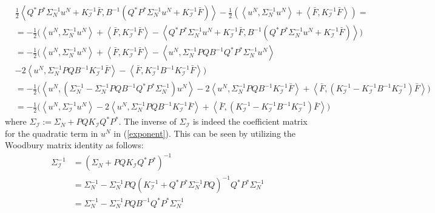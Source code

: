 \begin{align}
    &\frac{1}{2}\left\langle Q^{*}P^{*}\Sigma_{N}^{-1}u^{N} + K_{\mathcal{I}}^{-1}\bar{F}, B^{-1}\left(Q^{*}P^{*}\Sigma_{N}^{-1}u^{N} + K_{\mathcal{I}}^{-1}\bar{F}\right) \right\rangle -\frac{1}{2}\left(\left\langle u^{N}, \Sigma_{N}^{-1}u^{N}\right\rangle + \left\langle \bar{F},K_{\mathcal{I}}^{-1}\bar{F} \right\rangle \right) =  \nonumber \\
    &=-\frac{1}{2}\Big( \left\langle u^{N}, \Sigma_{N}^{-1}u^{N}\right\rangle + \left\langle \bar{F}, K_{\mathcal{I}}^{-1}\bar{F} \right\rangle - \left\langle Q^{*}P^{*}\Sigma_{N}^{-1}u^{N} + K_{\mathcal{I}}^{-1}\bar{F}, B^{-1}\left(Q^{*}P^{*}\Sigma_{N}^{-1}u^{N} + K_{\mathcal{I}}^{-1}\bar{F}\right) \right\rangle \Big) \nonumber \\
    &=-\frac{1}{2}\Big(\left\langle u^{N}, \Sigma_{N}^{-1}u^{N}\right\rangle + \left\langle \bar{F}, K_{\mathcal{I}}^{-1}\bar{F} \right\rangle - \left\langle u^{N},\Sigma_{N}^{-1}PQB^{-1}Q^{*}P^{*}\Sigma_{N}^{-1}u^{N} \right\rangle \nonumber \\
    &- 2\left\langle u^{N},\Sigma_{N}^{-1}PQB^{-1}K_{\mathcal{I}}^{-1}\bar{F} \right\rangle - \left\langle \bar{F}, K_{\mathcal{I}}^{-1}B^{-1}K_{\mathcal{I}}^{-1}\bar{F} \right\rangle \Big) \nonumber \\
    &= -\frac{1}{2}\Big( \left\langle u^{N}, (\Sigma_{N}^{-1} - \Sigma_{N}^{-1}PQB^{-1}Q^{*}P^{*}\Sigma_{N}^{-1})u^{N} \right\rangle - 2 \left\langle u^{N},\Sigma_{N}^{-1}PQB^{-1}K_{\mathcal{I}}^{-1}\bar{F} \right\rangle + \left\langle \bar{F}, (K_{\mathcal{I}}^{-1}-K_{\mathcal{I}}^{-1}B^{-1}K_{\mathcal{I}}^{-1})\bar{F} \right\rangle \Big) \nonumber \\
    &=-\frac{1}{2}\Big( \left\langle u^{N}, \Sigma_{\mathcal{I}}^{-1}u^{N} \right\rangle - 2 \left\langle u^{N},\Sigma_{N}^{-1}PQB^{-1}K_{\mathcal{I}}^{-1}\bar{F} \right\rangle + \left\langle \bar{F}, (K_{\mathcal{I}}^{-1}-K_{\mathcal{I}}^{-1}B^{-1}K_{\mathcal{I}}^{-1})\bar{F} \right\rangle \Big) \label{exponent}
\end{align}
where $\Sigma_{\mathcal{I}}:=\Sigma_{N} + PQK_{\mathcal{I}}Q^{*}P^{*}$. The inverse of $\Sigma_{\mathcal{I}}$ is indeed the coefficient matrix for the quadratic term in $u^{N}$ in (\ref{exponent}). This can be seen by utilizing the Woodbury matrix identity as follows:
\begin{align*}
    \Sigma_{\mathcal{I}}^{-1}&=(\Sigma_{N} + PQK_{\mathcal{I}}Q^{*}P^{*})^{-1} \\
    &=\Sigma_{N}^{-1}-\Sigma_{N}^{-1}PQ(K_{\mathcal{I}}^{-1}+Q^{*}P^{*}\Sigma_{N}^{-1}PQ)^{-1}Q^{*}P^{*}\Sigma_{N}^{-1} \\
    &=\Sigma_{N}^{-1}-\Sigma_{N}^{-1}PQB^{-1}Q^{*}P^{*}\Sigma_{N}^{-1}
\end{align*}
